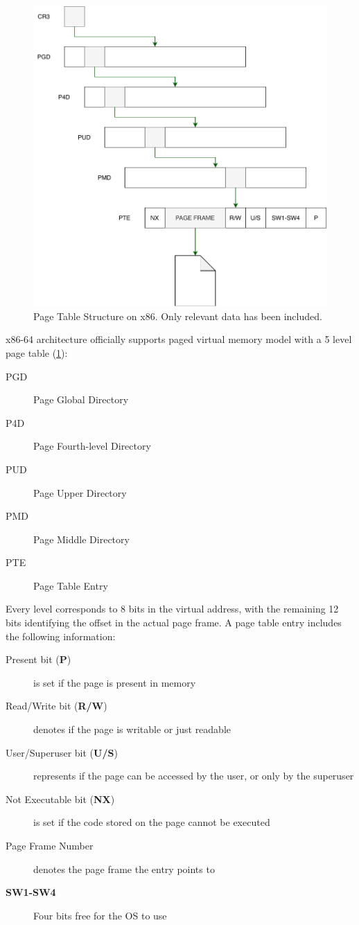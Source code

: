\begin{figure}[]
  \centering
  \includegraphics[width = .35 \textwidth]{img/pagetable.pdf}
  \caption{Page Table Structure on x86. Only relevant data has been included.}
  \label{fig:pagetable}
\end{figure}
x86-64 architecture officially supports paged virtual memory model with a 5 
level page table (\cref{fig:pagetable}):
\begin{description}
    \item[PGD] Page Global Directory
    \item[P4D] Page Fourth-level Directory
    \item[PUD] Page Upper Directory
    \item[PMD] Page Middle Directory
    \item[PTE] Page Table Entry
\end{description}

Every level corresponds to 8 bits in the virtual address, with the remaining 12
bits identifying the offset in the actual page frame. A page table entry
includes the following information:
\begin{description}
    \item[Present bit (\textbf{P})] is set if the page is present in memory
    \item[Read/Write bit (\textbf{R/W})] denotes if the page is writable or just
         readable
    \item[User/Superuser bit (\textbf{U/S})] represents if the page can be 
    accessed by the user, or only by the superuser
    \item[Not Executable bit (\textbf{NX})] is set if the code stored on the 
    page cannot be executed
    \item[Page Frame Number] denotes the page frame the entry points to
    \item[\textbf{SW1-SW4}] Four bits free for the OS to use
\end{description}

